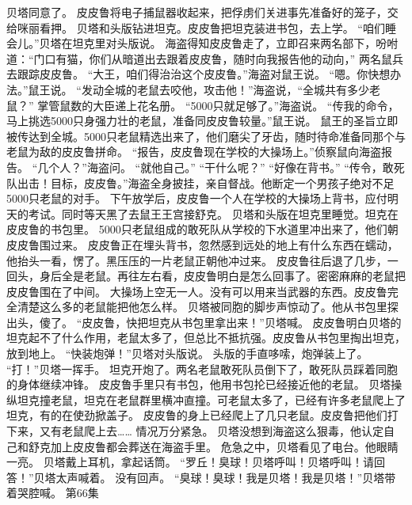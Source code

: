 \documentclass[a4paper,12pt,UTF8,twoside]{ctexbook}
\begin{document}
        贝塔同意了。 
        皮皮鲁将电子捕鼠器收起来，把俘虏们关进事先准备好的笼子，交给咪丽看押。 
        贝塔和头版钻进坦克。皮皮鲁把坦克装进书包，去上学。 
        “咱们睡会儿。”贝塔在坦克里对头版说。 
        海盗得知皮皮鲁走了，立即召来两名部下，吩咐道：“门口有猫，你们从暗道出去跟着皮皮鲁，随时向我报告他的动向，” 
        两名鼠兵去跟踪皮皮鲁。 
        “大王，咱们得治治这个皮皮鲁。”海盗对鼠王说。 
        “嗯。你快想办法。”鼠王说。 
        “发动全城的老鼠去咬他，攻击他！”海盗说，“全城共有多少老鼠？” 
        掌管鼠数的大臣递上花名册。 
        “5000只就足够了。”海盗说。 
        “传我的命令，马上挑选5000只身强力壮的老鼠，准备同皮皮鲁较量。”鼠王说。 
        鼠王的圣旨立即被传达到全城。5000只老鼠精选出来了，他们磨尖了牙齿，随时待命准备同那个与老鼠为敌的皮皮鲁拼命。 
        “报告，皮皮鲁现在学校的大操场上。”侦察鼠向海盗报告。 
        “几个人？”海盗问。 
        “就他自己。” 
        “干什么呢？” 
        “好像在背书。” 
        “传令，敢死队出击！目标，皮皮鲁。”海盗全身披挂，亲自督战。他断定一个男孩子绝对不足5000只老鼠的对手。 
        下午放学后，皮皮鲁一个人在学校的大操场上背书，应付明天的考试。同时等天黑了去鼠王王宫接舒克。 
        贝塔和头版在坦克里睡觉。坦克在皮皮鲁的书包里。 
        5000只老鼠组成的敢死队从学校的下水道里冲出来了，他们朝皮皮鲁围过来。 
        皮皮鲁正在埋头背书，忽然感到远处的地上有什么东西在蠕动，他抬头一看，愣了。黑压压的一片老鼠正朝他冲过来。 
        皮皮鲁往后退了几步，一回头，身后全是老鼠。再往左右看，皮皮鲁明白是怎么回事了。密密麻麻的老鼠把皮皮鲁围在了中间。 
        大操场上空无一人。没有可以用来当武器的东西。皮皮鲁完全清楚这么多的老鼠能把他怎么样。 
        贝塔被同胞的脚步声惊动了。他从书包里探出头，傻了。 
        “皮皮鲁，快把坦克从书包里拿出来！”贝塔喊。 
        皮皮鲁明白贝塔的坦克起不了什么作用，老鼠太多了，但总比不抵抗强。皮皮鲁从书包里掏出坦克，放到地上。 
        “快装炮弹！”贝塔对头版说。 
        头版的手直哆嗦，炮弹装上了。 
        “打！”贝塔一挥手。 
        坦克开炮了。两名老鼠敢死队员倒下了，敢死队员踩着同胞的身体继续冲锋。 
        皮皮鲁手里只有书包，他用书包抡已经接近他的老鼠。 
        贝塔操纵坦克撞老鼠，坦克在老鼠群里横冲直撞。可老鼠太多了，已经有许多老鼠爬上了坦克，有的在使劲掀盖子。 
        皮皮鲁的身上已经爬上了几只老鼠。皮皮鲁把他们打下来，又有老鼠爬上去…… 
        情况万分紧急。 
        贝塔没想到海盗这么狠毒，他认定自己和舒克加上皮皮鲁都会葬送在海盗手里。 
        危急之中，贝塔看见了电台。他眼睛一亮。 
        贝塔戴上耳机，拿起话筒。 
        “罗丘！臭球！贝塔呼叫！贝塔呼叫！请回答！”贝塔太声喊着。 
        没有回声。 
        “臭球！臭球！我是贝塔！我是贝塔！”贝塔带着哭腔喊。   第66集 
\end{document}
